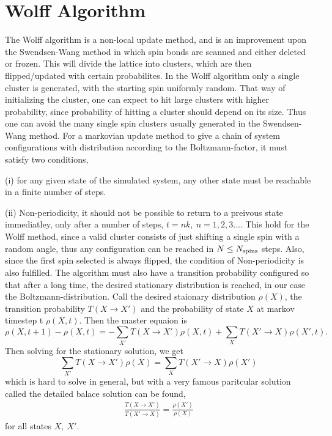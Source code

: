 \section{Wolff Algorithm}
The Wolff algorithm is a non-local update method, and is an improvement upon the Swendsen-Wang method in which spin bonds are scanned and either deleted or frozen. This will divide the lattice into clusters, which are then flipped/updated with certain probabilites. In the Wolff algorithm only a single cluster is generated, with the starting spin uniformly random. That way of initializing the cluster, one can expect to hit large clusters with higher probability, since probability of hitting a cluster should depend on its size.
Thus one can avoid the many single spin clusters usually generated in the Swendsen-Wang method.
For a markovian update method to give a chain of system configurations with distribution according to the Boltzmann-factor, it must satisfy two conditions, 

(i) for any given state of the simulated system, any other state must be reachable in a finite number of steps.

(ii) Non-periodicity, it should not be possible to return to a preivous state immediatley, only after a number of steps, $t =nk,~ n = 1,2,3\dots$.
This hold for the Wolff method, since a valid cluster consists of just shifting a single spin with a random angle, thus any configuration can be reached in $N \leq N_{\textrm{spins}}$ steps. Also, since the first spin selected is always flipped, the condition of Non-periodicity is also fulfilled.
The algorithm must also have a transition probability configured so that after a long time, the desired stationary distribution is reached, in our case the Boltzmann-distribution.
Call the desired staionary distribution $\rho(X)$, the transition probability $T(X \rightarrow X')$ and the probability of state $X$ at markov timestep t $\rho(X,t)$.
Then the master equaion is 
\begin{equation}
  \rho(X, t+1) - \rho(X,t) = -\sum_{X'} T(X\rightarrow X')\rho(X,t) +\sum_{X} T(X'\rightarrow X)\rho(X',t).
\end{equation}
Then solving for the stationary solution, we get
\begin{equation}
  \sum_{X'}T(X\rightarrow X') \rho(X) =  \sum_{X}T(X'\rightarrow X) \rho(X')
\end{equation}
which is hard to solve in general, but with a very famous paritcular solution called the detailed balace solution can be found,
\begin{align}
  \frac{T(X\rightarrow X')}{T(X'\rightarrow X)} = \frac{\rho(X')}{\rho(X)} 
  \label{eq:detbal}
\end{align}
for all states $X,~X'$.


